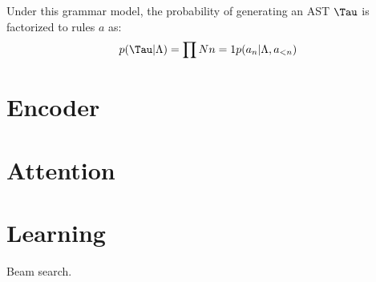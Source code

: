 %
%

Under this grammar model, the probability of generating an AST $\Tau$ is factorized to rules $a$ as:
\begin{equation}
p(\Tau|\Lambda) = \prod{N}{n=1} p(a_n|\Lambda, a_{<n})
\label{eqn:factorized}
\end{equation}

\section{Encoder}


\section{Attention}

\section{Learning}
Beam search.